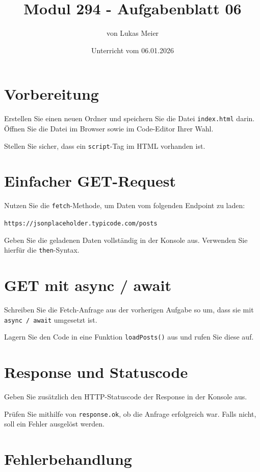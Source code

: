 \documentclass[a4paper,12pt]{article}
\title{Modul 294 - Aufgabenblatt 06}
\author{von Lukas Meier}
\date{Unterricht vom 06.01.2026}
\begin{document}
\maketitle

\section{Vorbereitung}

Erstellen Sie einen neuen Ordner und speichern Sie die Datei \texttt{index.html} darin.  
Öffnen Sie die Datei im Browser sowie im Code-Editor Ihrer Wahl.

Stellen Sie sicher, dass ein \texttt{script}-Tag im HTML vorhanden ist.

\section{Einfacher GET-Request}

Nutzen Sie die \texttt{fetch}-Methode, um Daten vom folgenden Endpoint zu laden:

\texttt{https://jsonplaceholder.typicode.com/posts}

Geben Sie die geladenen Daten vollständig in der Konsole aus.  
Verwenden Sie hierfür die \texttt{then}-Syntax.

\section{GET mit async / await}

Schreiben Sie die Fetch-Anfrage aus der vorherigen Aufgabe so um, dass sie mit \texttt{async / await} umgesetzt ist.

Lagern Sie den Code in eine Funktion \texttt{loadPosts()} aus und rufen Sie diese auf.

\section{Response und Statuscode}

Geben Sie zusätzlich den HTTP-Statuscode der Response in der Konsole aus.

Prüfen Sie mithilfe von \texttt{response.ok}, ob die Anfrage erfolgreich war.  
Falls nicht, soll ein Fehler ausgelöst werden.

\section{Fehlerbehandlung}
\end{document}
